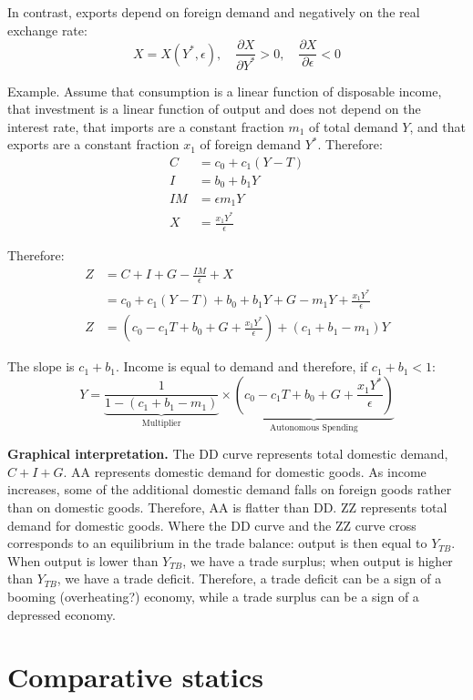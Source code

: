\documentclass[]{book}
\theoremstyle{definition}
\theoremstyle{definition}
\theoremstyle{definition}
\theoremstyle{remark}
\begin{document}
In contrast, exports depend on foreign demand and negatively on the real
exchange rate:
\[X=X\left(Y^{*},\epsilon\right),\quad\frac{\partial X}{\partial Y^{*}}>0,\quad\frac{\partial X}{\partial\epsilon}<0\]

Example. Assume that consumption is a linear function of disposable
income, that investment is a linear function of output and does not
depend on the interest rate, that imports are a constant fraction
\(m_{1}\) of total demand \(Y\), and that exports are a constant
fraction \(x_{1}\) of foreign demand \(Y^{*}\). Therefore: \[
\begin{aligned}
C   &=c_{0}+c_{1}\left(Y-T\right)\\
I   &=b_{0}+b_{1}Y\\
IM  &=\epsilon m_{1}Y\\
X   &=\frac{x_{1}Y^{*}}{\epsilon}
\end{aligned}
\]

Therefore: \[
\begin{aligned}
Z   &=C+I+G-\frac{IM}{\epsilon}+X\\
    &=c_{0}+c_{1}\left(Y-T\right)+b_{0}+b_{1}Y+G-m_{1}Y+\frac{x_{1}Y^{*}}{\epsilon}\\
Z   &=\left(c_{0}-c_{1}T+b_{0}+G+\frac{x_{1}Y^{*}}{\epsilon}\right)+\left(c_{1}+b_{1}-m_{1}\right)Y
\end{aligned}
\]

The slope is \(c_{1}+b_{1}\). Income is equal to demand and therefore,
if \(c_{1}+b_{1}<1\):
\[\boxed{Y=\underbrace{\frac{1}{1-\left(c_{1}+b_{1}-m_{1}\right)}}_{\text{Multiplier}}\times\underbrace{\left(c_{0}-c_{1}T+b_{0}+G+\frac{x_{1}Y^{*}}{\epsilon}\right)}_{\text{Autonomous Spending}}}\]

\textbf{Graphical interpretation.} The DD curve represents total
domestic demand, \(C+I+G\). AA represents domestic demand for domestic
goods. As income increases, some of the additional domestic demand falls
on foreign goods rather than on domestic goods. Therefore, AA is flatter
than DD. ZZ represents total demand for domestic goods. Where the DD
curve and the ZZ curve cross corresponds to an equilibrium in the trade
balance: output is then equal to \(Y_{TB}\). When output is lower than
\(Y_{TB}\), we have a trade surplus; when output is higher than
\(Y_{TB}\), we have a trade deficit. Therefore, a trade deficit can be a
sign of a booming (overheating?) economy, while a trade surplus can be a
sign of a depressed economy.

\section{Comparative statics}\label{comparative-statics}
\end{document}
